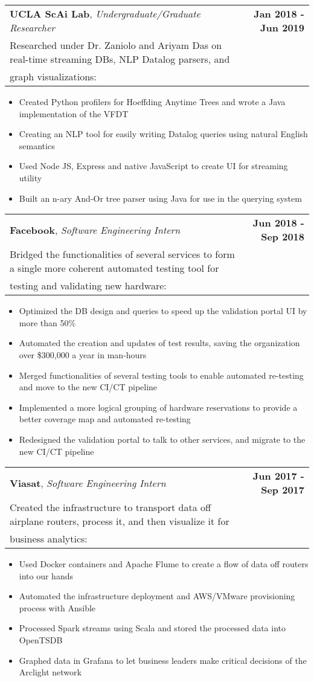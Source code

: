 \documentclass[letterpaper,10.8pt]{article}
\makeatletter
\newcommand{\resumeItemOne}[1]{
  \item[$\circ$]\small{{#1 \vspace{-2pt}}
  }
}
\newcommand{\resumeSubheading}[4]{
  \vspace{-2pt}\item[$ $]
    \begin{tabular*}{0.97\textwidth}{l@{\extracolsep{\fill}}r}
      \textbf{#1}, \textit{\small #2} & \textbf{\small #3} \\
      \small #4
    \end{tabular*}
  \vspace{-7pt}
}
\newcommand{\resumeItemListStart}{\begin{itemize}}
\newcommand{\resumeItemListEnd}{\end{itemize}\vspace{-5pt}}
\makeatother
\begin{document}
    \resumeSubheading
    {UCLA ScAi Lab}{Undergraduate/Graduate Researcher}{Jan 2018 - Jun 2019}{Researched under Dr. Zaniolo and Ariyam Das on real-time streaming DBs, NLP Datalog parsers, and\\ graph visualizations:}
    \resumeItemListStart
        \resumeItemOne{Created Python profilers for Hoeffding Anytime Trees and wrote a Java implementation of the VFDT}
        \resumeItemOne{Creating an NLP tool for easily writing Datalog queries using natural English semantics}
        \resumeItemOne{Used Node JS, Express and native JavaScript to create UI for streaming utility}
        \resumeItemOne{Built an n-ary And-Or tree parser using Java for use in the querying system}
    \resumeItemListEnd

    \resumeSubheading
    {Facebook}{Software Engineering Intern}{Jun 2018 - Sep 2018}{Bridged the functionalities of several services to form a single more coherent automated testing tool for\\ testing and validating new hardware: }
    \resumeItemListStart
        \resumeItemOne{Optimized the DB design and queries to speed up the validation portal UI by more than 50\%}
        \resumeItemOne{Automated the creation and updates of test results, saving the organization over \$300,000 a year in man-hours}
        \resumeItemOne{Merged functionalities of several testing tools to enable automated re-testing and move to the new CI/CT pipeline}
        \resumeItemOne{Implemented a more logical grouping of hardware reservations to provide a better coverage map and
        automated re-testing}
        \resumeItemOne{Redesigned the validation portal to talk to other services, and migrate to the new CI/CT pipeline}
    \resumeItemListEnd
  
    \resumeSubheading
    {Viasat}{Software Engineering Intern}{Jun 2017 - Sep 2017}{Created the infrastructure to transport data off airplane routers, process it, and then visualize it for \\ business analytics:}
    \resumeItemListStart
        \resumeItemOne{Used Docker containers and Apache Flume to create a flow of data off routers into our hands}
        \resumeItemOne{Automated the infrastructure deployment and AWS/VMware provisioning process with Ansible}
        \resumeItemOne{Processed Spark streams using Scala and stored the processed data into OpenTSDB}
        \resumeItemOne{Graphed data in Grafana to let business leaders make critical decisions of the Arclight network}
    \resumeItemListEnd
    
\end{document}
